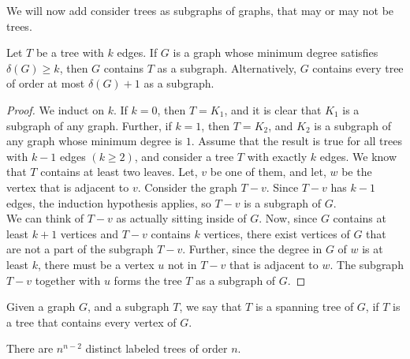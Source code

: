 \documentclass[../basic_graph_theory.tex]{subfiles}
\begin{document}
We will now add consider trees as subgraphs of graphs, that may or may not be trees.

\begin{thm}
    Let $T$ be a tree with $k$ edges. If $G$ is a graph whose minimum degree satisfies $\delta(G) \ge k$, then $G$ contains $T$ as a subgraph. Alternatively, $G$ contains every tree of order at most $\delta(G)+1$ as a subgraph.
\end{thm}
\begin{proof}
    We induct on $k$. If $k=0$, then $T=K_{1}$, and it is clear that $K_{1}$ is a subgraph of any graph. Further, if $k=1$, then $T=K_{2}$, and $K_{2}$ is a subgraph of any graph whose minimum degree is $1$. Assume that the result is true for all trees with $k-1$ edges $(k \ge 2)$, and consider a tree $T$ with exactly $k$ edges. We know that $T$ contains at least two leaves. Let, $v$ be one of them, and let, $w$ be the vertex that is adjacent to $v$. Consider the graph $T-v$. Since $T-v$ has $k-1$ edges, the induction hypothesis applies, so $T-v$ is a subgraph of $G$.\\
    We can think of $T-v$ as actually sitting inside of $G$. Now, since $G$ contains at least $k+1$ vertices and $T-v$ contains $k$ vertices, there exist vertices of $G$ that are not a part of the subgraph $T-v$. Further, since the degree in $G$ of $w$ is at least $k$, there must be a vertex $u$ not in $T-v$ that is adjacent to $w$. The subgraph $T-v$ together with $u$ forms the tree $T$ as a subgraph of $G$.
\end{proof}

\begin{defn}
    Given a graph $G$, and a subgraph $T$, we say that $T$ is a spanning tree of $G$, if $T$ is a tree that contains every vertex of $G$.
\end{defn}

\begin{thm}
    There are $n^{n-2}$ distinct labeled trees of order $n$.
\end{thm}

\end{document}
